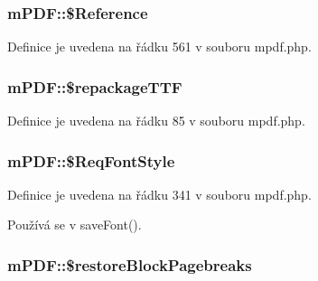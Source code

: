 \hypertarget{classm_p_d_f_a22a8986f8422e97942089945535172d5}{
\subsubsection[{\$\-Reference}]{\setlength{\rightskip}{0pt plus 5cm}m\-P\-D\-F\-::\$\-Reference}}\label{classm_p_d_f_a22a8986f8422e97942089945535172d5}


Definice je uvedena na řádku 561 v souboru mpdf.\-php.

\hypertarget{classm_p_d_f_a5b019effaf4f8838a37dbe4fa3d7d4aa}{
\subsubsection[{\$repackage\-T\-T\-F}]{\setlength{\rightskip}{0pt plus 5cm}m\-P\-D\-F\-::\$repackage\-T\-T\-F}}\label{classm_p_d_f_a5b019effaf4f8838a37dbe4fa3d7d4aa}


Definice je uvedena na řádku 85 v souboru mpdf.\-php.

\hypertarget{classm_p_d_f_a3da2acf01a1958a2158bace9282a834b}{
\subsubsection[{\$\-Req\-Font\-Style}]{\setlength{\rightskip}{0pt plus 5cm}m\-P\-D\-F\-::\$\-Req\-Font\-Style}}\label{classm_p_d_f_a3da2acf01a1958a2158bace9282a834b}


Definice je uvedena na řádku 341 v souboru mpdf.\-php.



Používá se v save\-Font().

\hypertarget{classm_p_d_f_adacc41a5b412bd9a054b8a4096125fbe}{
\subsubsection[{\$restore\-Block\-Pagebreaks}]{\setlength{\rightskip}{0pt plus 5cm}m\-P\-D\-F\-::\$restore\-Block\-Pagebreaks}}\label{classm_p_d_f_adacc41a5b412bd9a054b8a4096125fbe}



